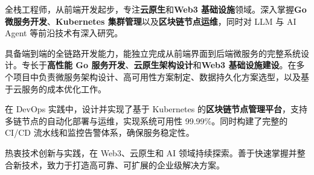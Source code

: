 \documentclass[zh]{resume}
\begin{document}
\makeheader

{\onehalfspacing
\hspace{2em} 全栈工程师，从前端开发起步，专注\textbf{云原生}和\textbf{Web3 基础设施}领域。深入掌握\textbf{Go 微服务开发}、\textbf{Kubernetes 集群管理}以及\textbf{区块链节点运维}，同时对 LLM 与 AI Agent 等前沿技术有深入研究。
\par}
{\onehalfspacing
\hspace{2em} 具备端到端的全链路开发能力，能独立完成从前端界面到后端微服务的完整系统设计。专长于\textbf{高性能 Go 服务开发}、\textbf{云原生架构设计}和\textbf{Web3 基础设施建设}。在多个项目中负责微服务架构设计、高可用性方案制定、数据持久化方案选型，以及基于云服务的成本优化工作。
\par}
{\onehalfspacing
\hspace{2em} 在 DevOps 实践中，设计并实现了基于 Kubernetes 的\textbf{区块链节点管理平台}，支持多链节点的自动化部署与运维，实现系统可用性 99.99\%。同时构建了完整的 CI/CD 流水线和监控告警体系，确保服务稳定性。
\par}
{\onehalfspacing
\hspace{2em} 热衷技术创新与实践，在 Web3、云原生和 AI 领域持续探索。善于快速掌握并整合新技术，致力于打造高可靠、可扩展的企业级解决方案。
\par}

\begin{competences}
\end{competences}
\end{document}
